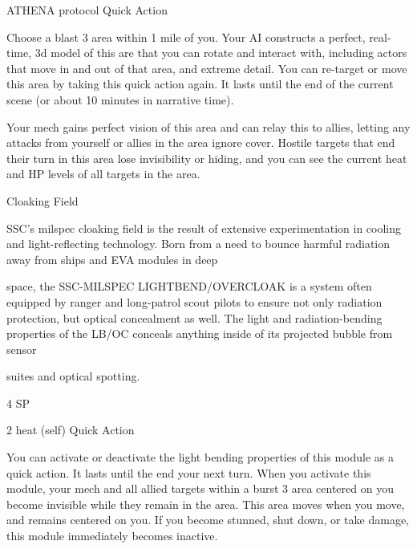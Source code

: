          ATHENA protocol
          Quick Action

          Choose a blast 3 area within 1 mile of you. Your AI constructs a perfect, real-time, 3d
          model of this are that you can rotate and interact with, including actors that move in and
          out of that area, and extreme detail. You can re-target or move this area by taking this
          quick action again. It lasts until the end of the current scene (or about 10 minutes in
          narrative time).


         Your mech gains perfect vision of this area and can relay this to allies, letting any attacks
         from yourself or allies in the area ignore cover. Hostile targets that end their turn in this
          area lose invisibility or hiding, and you can see the current heat and HP levels of all
         targets in the area.


Cloaking Field

SSC’s milspec cloaking field is the result of extensive experimentation in cooling and light-reflecting
technology. Born from a need to bounce harmful radiation away from ships and EVA modules in deep

space, the SSC-MILSPEC LIGHTBEND/OVERCLOAK is a system often equipped by ranger and long-patrol
scout pilots to ensure not only radiation protection, but optical concealment as well. The light and
radiation-bending properties of the LB/OC conceals anything inside of its projected bubble from sensor

suites and optical spotting.

4 SP

2 heat (self)
Quick Action

You can activate or deactivate the light bending properties of this module as a quick action. It
lasts until the end your next turn. When you activate this module, your mech and all allied targets
within a burst 3 area centered on you become invisible while they remain in the area. This area
moves when you move, and remains centered on you. If you become stunned, shut down, or
take damage, this module immediately becomes inactive.
